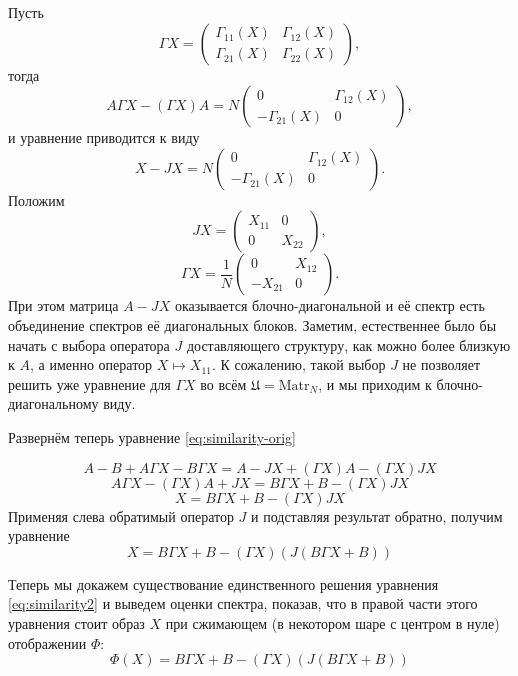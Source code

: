 Пусть
\[ \Gamma X =
\begin{pmatrix}
    \Gamma_{11}(X) & \Gamma_{12}(X) \\
    \Gamma_{21}(X) & \Gamma_{22}(X)
\end{pmatrix}, \]
тогда
\[
    A \Gamma X - (\Gamma X) A =
    N
    \begin{pmatrix}
        0               & \Gamma_{12}(X) \\
        -\Gamma_{21}(X) & 0
    \end{pmatrix},
\]
и уравнение приводится к виду
\[
    X - JX =
    N
    \begin{pmatrix}
        0               & \Gamma_{12}(X) \\
        -\Gamma_{21}(X) & 0
    \end{pmatrix}.
\]
Положим
\[
    JX = \begin{pmatrix}
        X_{11} & 0 \\
        0      & X_{22}
    \end{pmatrix},
    \]
\[ \Gamma X =
\frac1N
    \begin{pmatrix}
        0       & X_{12} \\
        -X_{21} & 0
    \end{pmatrix}.
    \]
При этом матрица \( A - JX \) оказывается блочно-диагональной
и её спектр есть объединение спектров её диагональных блоков.
Заметим, естественнее было бы начать с выбора оператора \( J \) доставляющего структуру,
как можно более близкую к \( A \), а именно
оператор \( X\mapsto X_{11} \).
К сожалению, такой выбор \( J \) не позволяет решить
уже уравнение для \(\Gamma X\) во всём \(\mathfrak U = \mathrm{Matr}_{N}\),
и мы приходим к блочно-диагональному виду.

Развернём теперь уравнение \eqref{eq:similarity-orig}

\[
    A - B + A\Gamma X - B\Gamma X = A - JX + (\Gamma X) A - (\Gamma X) JX
    \]
\[
    A\Gamma X - (\Gamma X) A + JX = B \Gamma X + B - (\Gamma X) JX
    \]
\[
    X = B \Gamma X + B - (\Gamma X) JX
    \]
Применяя слева обратимый оператор \( J \) и подставляя результат обратно, получим уравнение
\begin{equation}\label{eq:similarity2}
    X = B \Gamma X + B - (\Gamma X) (J(B\Gamma X + B))
\end{equation}

Теперь мы докажем существование единственного решения уравнения \eqref{eq:similarity2}
и выведем оценки спектра,
показав, что в правой части этого уравнения стоит образ \( X \)
при сжимающем (в некотором шаре с центром в нуле) отображении \( \Phi \):
\[ \Phi(X) = B \Gamma X + B - (\Gamma X) (J(B\Gamma X + B)) \]

